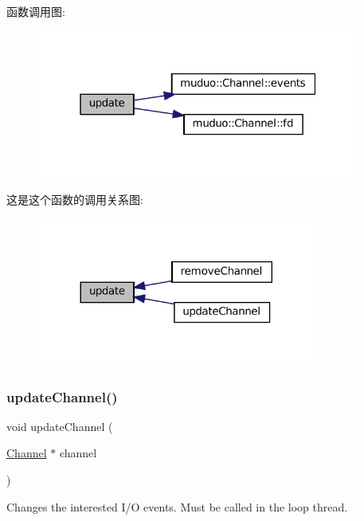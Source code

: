 函数调用图\+:
\nopagebreak
\begin{figure}[H]
\begin{center}
\leavevmode
\includegraphics[width=301pt]{classmuduo_1_1EPoller_af32077955d1a8c910bde719cb636efd8_cgraph}
\end{center}
\end{figure}
这是这个函数的调用关系图\+:
\nopagebreak
\begin{figure}[H]
\begin{center}
\leavevmode
\includegraphics[width=260pt]{classmuduo_1_1EPoller_af32077955d1a8c910bde719cb636efd8_icgraph}
\end{center}
\end{figure}
\mbox{\label{classmuduo_1_1EPoller_acaa4a191936aacf608d279a6f343d533}} 
\subsubsection{\texorpdfstring{update\+Channel()}{updateChannel()}}
{\footnotesize\ttfamily void update\+Channel (\begin{DoxyParamCaption}\item[{\hyperlink{classmuduo_1_1Channel}{Channel} $\ast$}]{channel }\end{DoxyParamCaption})}

Changes the interested I/O events. Must be called in the loop thread. 

